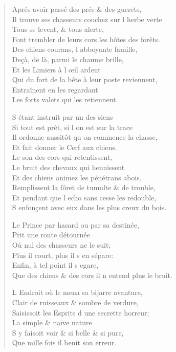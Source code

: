 \begin{verse}
Aprés avoir passé des prés \& des guerets, \\
Il trouve ses chasseurs couchez sur l\textquotesingle{} herbe verte \\
\vin Tous se levent, \& tous alerte, \\
Font trembler de leurs cors les hôtes des forêts. \\
\vin Des chiens courans, l\textquotesingle{} abboyante famille, \\
\vin Deçà, de là, parmi le chaume brille, \\
\vin Et les Limiers à l\textquotesingle{} œil ardent \\
Qui du fort de la bête à leur poste reviennent, \\
\vin Entraînent en les regardant \\
\vin Les forts valets qui les retiennent.

\vin S\textquotesingle{} étant instruit par un des siens \\
\vin Si tout est prêt, si l\textquotesingle{} on est sur la trace \\
Il ordonne aussitôt qu\textquotesingle{} on commence la chasse, \\
\vin Et fait donner le Cerf aux chiens. \\
\vin Le son des cors qui retentissent, \\
\vin Le bruit des chevaux qui hennissent \\
Et des chiens animez les pénétrans abois, \\
Remplissent la fôret de tumulte \& de trouble, \\
Et pendant que l\textquotesingle{} echo sans cesse les redouble, \\
S\textquotesingle{} enfonçent avec eux dans les plus creux du bois.

Le Prince par hasard ou par sa destinée, \\
\vin Prit une route détournée \\
\vin Où nul des chasseurs ne le suit; \\
\vin Plus il court, plus il s\textquotesingle{} en sépare: \\
\vin Enfin, à tel point il s\textquotesingle{} egare, \\
Que des chiens \& des cors il n\textquotesingle{} entend plus le bruit.

L\textquotesingle{} Endroit où le mena sa bijarre avanture, \\
\vin Clair de ruisseaux \& sombre de verdure, \\
Saisissoit les Esprits d\textquotesingle{} une secrette horreur; \\
\vin La simple \& naïve nature \\
\vin S\textquotesingle{} y faisoit voir \& si belle \& si pure, \\
\vin Que mille fois il benit son erreur.


\end{verse}
